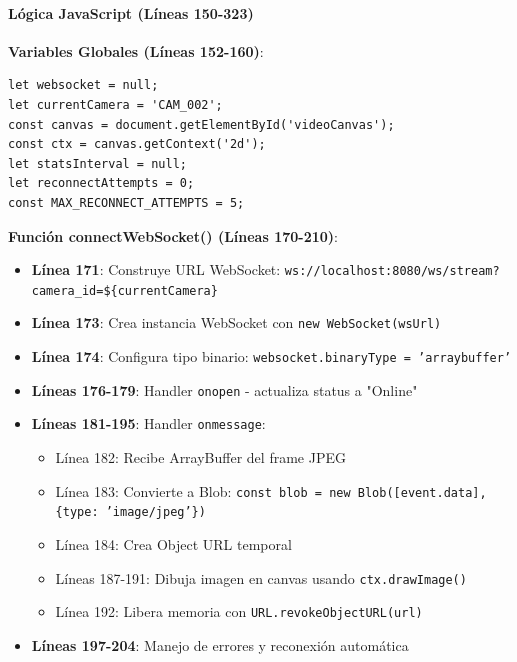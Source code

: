 \paragraph{Lógica JavaScript (Líneas 150-323)}

\textbf{Variables Globales (Líneas 152-160)}:
\begin{lstlisting}[style=jsstyle, caption={Variables Globales - modulo1.blade.php}]
let websocket = null;
let currentCamera = 'CAM_002';
const canvas = document.getElementById('videoCanvas');
const ctx = canvas.getContext('2d');
let statsInterval = null;
let reconnectAttempts = 0;
const MAX_RECONNECT_ATTEMPTS = 5;
\end{lstlisting}

\textbf{Función connectWebSocket() (Líneas 170-210)}:
\begin{itemize}
    \item \textbf{Línea 171}: Construye URL WebSocket: \texttt{ws://localhost:8080/ws/stream?camera\_id=\$\{currentCamera\}}
    \item \textbf{Línea 173}: Crea instancia WebSocket con \texttt{new WebSocket(wsUrl)}
    \item \textbf{Línea 174}: Configura tipo binario: \texttt{websocket.binaryType = 'arraybuffer'}
    \item \textbf{Líneas 176-179}: Handler \texttt{onopen} - actualiza status a "Online"
    \item \textbf{Líneas 181-195}: Handler \texttt{onmessage}:
    \begin{itemize}
        \item Línea 182: Recibe ArrayBuffer del frame JPEG
        \item Línea 183: Convierte a Blob: \texttt{const blob = new Blob([event.data], \{type: 'image/jpeg'\})}
        \item Línea 184: Crea Object URL temporal
        \item Líneas 187-191: Dibuja imagen en canvas usando \texttt{ctx.drawImage()}
        \item Línea 192: Libera memoria con \texttt{URL.revokeObjectURL(url)}
    \end{itemize}
    \item \textbf{Líneas 197-204}: Manejo de errores y reconexión automática
\end{itemize}

